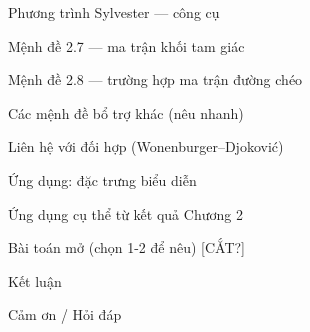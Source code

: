 
\begin{frame}{Phương trình Sylvester — công cụ}
\note{
}
\end{frame}

\begin{frame}{Mệnh đề 2.7 — ma trận khối tam giác}
\note{
}
\end{frame}

\begin{frame}{Mệnh đề 2.8 — trường hợp ma trận đường chéo}
\note{
}
\end{frame}


\begin{frame}{Các mệnh đề bổ trợ khác (nêu nhanh)}
\note{
}
\end{frame}


\begin{frame}{Liên hệ với đối hợp (Wonenburger--Djoković)}
\note{
}
\end{frame}

\begin{frame}{Ứng dụng: đặc trưng biểu diễn}
\note{
}
\end{frame}

\begin{frame}{Ứng dụng cụ thể từ kết quả Chương 2}
\note{
}
\end{frame}

\begin{frame}{Bài toán mở (chọn 1-2 để nêu) [CẮT?]}
\note{
}
\end{frame}


\begin{frame}{Kết luận}
\note{
}
\end{frame}

\begin{frame}{Cảm ơn / Hỏi đáp}
\note{
}
\end{frame}